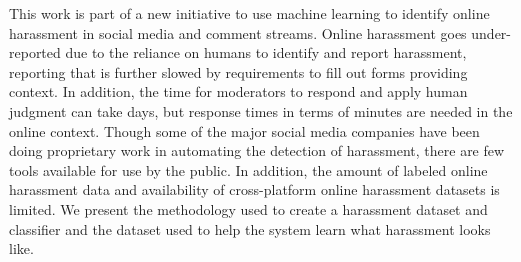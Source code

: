 This work is part of a new initiative to use machine learning to identify online harassment in social media and comment streams. Online harassment goes under-reported due to the reliance on humans to identify and report harassment, reporting that is further slowed by requirements to fill out forms providing context. In addition, the time for moderators to respond and apply human judgment can take days, but response times in terms of minutes are needed in the online context. Though some of the major social media companies have been doing proprietary work in automating the detection of harassment, there are few tools available for use by the public. In addition, the amount of labeled online harassment data and availability of cross-platform online harassment datasets is limited. We present the methodology used to create a harassment dataset and classifier and the dataset used to help the system learn what harassment looks like.
